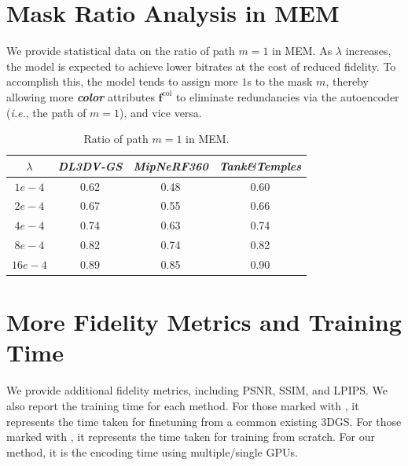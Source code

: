 \documentclass{article} %
\newcommand{\ie}{\textit{i.e.}}
\begin{document}
\section{Mask Ratio Analysis in MEM}
We provide statistical data on the ratio of path $m=1$ in MEM. As $\lambda$ increases, the model is expected to achieve lower bitrates at the cost of reduced fidelity. To accomplish this, the model tends to assign more $1$s to the mask $m$, thereby allowing more \textbf{\textit{color}} attributes $\bm{f}^{\text{col}}$ to eliminate redundancies via the autoencoder (\ie, the path of $m=1$), and vice versa.

\vspace{-10pt}
\begin{table}[H]
    \normalsize
    \centering
    \caption{Ratio of path $m=1$ in MEM.}
    \renewcommand{\arraystretch}{1.00}
        \begin{tabular}{c|ccc}
        \toprule[2pt]
         $\lambda$ & \textit{DL3DV-GS} & \textit{MipNeRF360}  & \textit{Tank\&Temples}   \\ \toprule
        $1e-4$  & 0.62  & 0.48 & 0.60 \\
        $2e-4$  & 0.67  & 0.55 & 0.66 \\
        $4e-4$  & 0.74  & 0.63 & 0.74 \\
        $8e-4$  & 0.82  & 0.74 & 0.82 \\
        $16e-4$ & 0.89  & 0.85 & 0.90 \\ \bottomrule[2pt]
        \end{tabular}
\end{table}

\clearpage

\section{More Fidelity Metrics and Training Time}
\label{sec:more_fidelity}
We provide additional fidelity metrics, including PSNR, SSIM, and LPIPS. We also report the training time for each method. For those marked with \text{*}, it represents the time taken for finetuning from a common existing 3DGS. For those marked with \text{**}, it represents the time taken for training from scratch. For our method, it is the encoding time using multiple/single GPUs.
\end{document}
